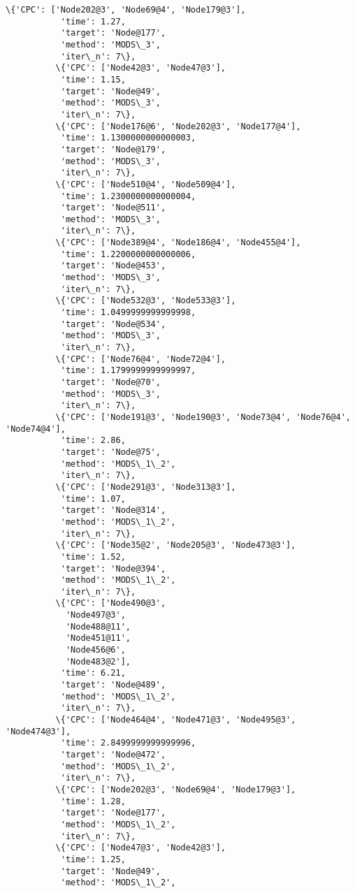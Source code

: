 \documentclass[11pt]{article}
\begin{document}
\begin{Verbatim}[commandchars=\\\{\}]
          \{'CPC': ['Node202@3', 'Node69@4', 'Node179@3'],
           'time': 1.27,
           'target': 'Node@177',
           'method': 'MODS\_3',
           'iter\_n': 7\},
          \{'CPC': ['Node42@3', 'Node47@3'],
           'time': 1.15,
           'target': 'Node@49',
           'method': 'MODS\_3',
           'iter\_n': 7\},
          \{'CPC': ['Node176@6', 'Node202@3', 'Node177@4'],
           'time': 1.1300000000000003,
           'target': 'Node@179',
           'method': 'MODS\_3',
           'iter\_n': 7\},
          \{'CPC': ['Node510@4', 'Node509@4'],
           'time': 1.2300000000000004,
           'target': 'Node@511',
           'method': 'MODS\_3',
           'iter\_n': 7\},
          \{'CPC': ['Node389@4', 'Node186@4', 'Node455@4'],
           'time': 1.2200000000000006,
           'target': 'Node@453',
           'method': 'MODS\_3',
           'iter\_n': 7\},
          \{'CPC': ['Node532@3', 'Node533@3'],
           'time': 1.0499999999999998,
           'target': 'Node@534',
           'method': 'MODS\_3',
           'iter\_n': 7\},
          \{'CPC': ['Node76@4', 'Node72@4'],
           'time': 1.1799999999999997,
           'target': 'Node@70',
           'method': 'MODS\_3',
           'iter\_n': 7\},
          \{'CPC': ['Node191@3', 'Node190@3', 'Node73@4', 'Node76@4', 'Node74@4'],
           'time': 2.86,
           'target': 'Node@75',
           'method': 'MODS\_1\_2',
           'iter\_n': 7\},
          \{'CPC': ['Node291@3', 'Node313@3'],
           'time': 1.07,
           'target': 'Node@314',
           'method': 'MODS\_1\_2',
           'iter\_n': 7\},
          \{'CPC': ['Node35@2', 'Node205@3', 'Node473@3'],
           'time': 1.52,
           'target': 'Node@394',
           'method': 'MODS\_1\_2',
           'iter\_n': 7\},
          \{'CPC': ['Node490@3',
            'Node497@3',
            'Node488@11',
            'Node451@11',
            'Node456@6',
            'Node483@2'],
           'time': 6.21,
           'target': 'Node@489',
           'method': 'MODS\_1\_2',
           'iter\_n': 7\},
          \{'CPC': ['Node464@4', 'Node471@3', 'Node495@3', 'Node474@3'],
           'time': 2.8499999999999996,
           'target': 'Node@472',
           'method': 'MODS\_1\_2',
           'iter\_n': 7\},
          \{'CPC': ['Node202@3', 'Node69@4', 'Node179@3'],
           'time': 1.28,
           'target': 'Node@177',
           'method': 'MODS\_1\_2',
           'iter\_n': 7\},
          \{'CPC': ['Node47@3', 'Node42@3'],
           'time': 1.25,
           'target': 'Node@49',
           'method': 'MODS\_1\_2',

\end{Verbatim}
\end{document}
